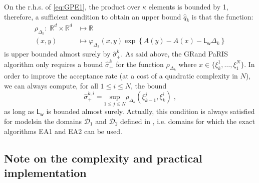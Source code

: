 \documentclass[12pt]{article}
\newcommand{\eqsp}{\;}
\newcommand{\1}{\mathrm{1}}
\newcommand{\mw}{\mathsf{w}}%
\newcommand{\Lo}{\mathsf{L}}
\begin{document}
On the r.h.s. of \eqref{eq:GPE1}, the product over $\kappa$ elements is bounded by 1, therefore, a sufficient condition to obtain an upper bound  $\hat{q}_k$ is that the function:
\begin{align}
\rho_{\Delta_k}:\eqsp\mathbb{R}^d\times \mathbb{R}^d &\mapsto \mathbb{R}\nonumber\\
(x,y)&\mapsto \varphi_{\Delta_k}(x,y) \exp \left\{A(y) - A(x)- \Lo_\mw\Delta_k \right\}\label{eq:rho:func}
\end{align}
is upper bounded almost surely by $\hat{\sigma}_+^k$.
As said above, the GRand PaRIS algorithm only requires a bound $\hat{\sigma}_+^k$ for the function $\rho_{\Delta_k}$ where $x \in \{\xi_{k}^1,\dots,\xi_{1}^N\}$. In order to improve the acceptance rate (at a cost of a quadratic complexity in $N$), we can always compute, for all $1\le i\le N$, the bound 
\begin{equation}
\hat{\sigma}_{+}^{k,i}= \underset{1 \le j\le N}{\text{sup}}\rho_{\Delta_k}(\xi_{k-1}^j,\xi_k^i)\eqsp, \label{eq:quadr:bound}
\end{equation}
as long as $\Lo_\mw$ is bounded almost surely. Actually, this condition is always satisfied for modelsin the domains $\mathcal{D}_1$ and $\mathcal{D}_2$ defined in \cite{beskos:papaspiliopoulos:roberts:fearnhead:2006}, i.e. domains for which the exact algorithms EA1 and EA2 can be used.
\subsection*{Note on the complexity and practical implementation}
\end{document}

